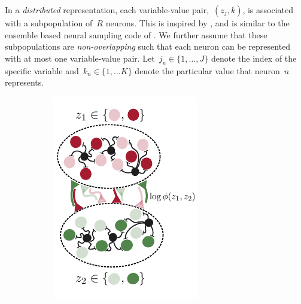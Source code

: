 In a \emph{distributed} representation, each variable-value
pair,~$(z_j,k)$, is associated with a subpopulation of~$R$
neurons. This is inspired by \citet{valiant1994circuits,
  valiant2005memorization}, and is similar to the ensemble based
neural sampling code of \citet{legenstein2014ensembles}.  We further
assume that these subpopulations are \emph{non-overlapping} such that
each neuron can be represented with at most one variable-value pair.
Let~${j_n \in \{1, \ldots, J\}}$ denote the index of the specific
variable and~$k_n \in \{1, \ldots K\}$ denote the particular
value that neuron~$n$ represents.


\begin{figure}[t!]
  \centering
  \begin{subfigure}[b]{1.6in}
    \centering
    \caption{}
    \vspace{-.3in}
    \includegraphics[width=\textwidth]{figures/ch9/example_population2.pdf}

\end{subfigure}
\end{figure}

